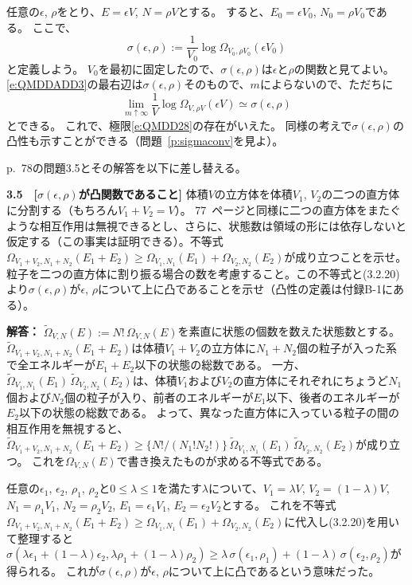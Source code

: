 \documentclass[12pt,a4paper]{jsarticle}
\begin{document}
任意の$\epsilon$, $\rho$をとり、$E=\epsilon V$, $N=\rho V$とする。
すると、$E_0=\epsilon V_0$, $N_0=\rho V_0$である。
ここで、
\begin{equation}
\sigma(\epsilon,\rho):=\frac{1}{V_0}\log\Omega_{V_0,\rho V_0}(\epsilon V_0)
\tag{3.2.34}
\label{e:QMDDADD4}
\end{equation}
と定義しよう。
$V_0$を最初に固定したので、$\sigma(\epsilon,\rho)$は$\epsilon$と$\rho$の関数と見てよい。
\eqref{e:QMDDADD3}の最右辺は$\sigma(\epsilon,\rho)$そのもので、$m$によらないので、ただちに
\begin{equation}
\lim_{m\uparrow\infty}\frac{1}{V}\log\Omega_{V,\rho V}(\epsilon V)
\simeq\sigma(\epsilon,\rho)
\tag{3.2.35}
\label{e:QMDDADD4BB}
\end{equation}
とできる。
これで、極限\eqref{e:QMDD28}の存在がいえた。
同様の考えで$\sigma(\epsilon,\rho)$の凸性も示すことができる（問題~\ref{p:sigmaconv}を見よ）。


\bigskip\bigskip

\noindent
p.~78の問題3.5とその解答を以下に差し替える。



\bigskip
\noindent
{\bf 3.5　[$\sigma(\epsilon,\rho)$が凸関数であること]} 
体積$V$の立方体を体積$V_1$, $V_2$の二つの直方体に分割する（もちろん$V_1+V_2=V$）。
77~ページと同様に二つの直方体をまたぐような相互作用は無視できるとし、さらに、状態数は領域の形には依存しないと仮定する（この事実は証明できる）。不等式$\Omega_{V_1+V_2,N_1+N_2}(E_1+E_2)\ge\Omega_{V_1,N_1}(E_1)+\Omega_{V_2,N_2}(E_2)$が成り立つことを示せ。粒子を二つの直方体に割り振る場合の数を考慮すること。この不等式と(3.2.20)より$\sigma(\epsilon,\rho)$が$\epsilon$, $\rho$について上に凸であることを示せ（凸性の定義は付録B-1にある）。

\medskip\noindent
{\bf 解答：}
$\widetilde{\Omega}_{V,N}(E):=N!\,{\Omega}_{V,N}(E)$を素直に状態の個数を数えた状態数とする。
$\widetilde{\Omega}_{V_1+V_2,N_1+N_2}(E_1+E_2)$は体積$V_1+V_2$の立方体に$N_1+N_2$個の粒子が入った系で全エネルギーが$E_1+E_2$以下の状態の総数である。
一方、$\widetilde{\Omega}_{V_1,N_1}(E_1)\,\widetilde{\Omega}_{V_2,N_2}(E_2)$は、体積$V_1$および$V_2$の直方体にそれぞれにちょうど$N_1$個および$N_2$個の粒子が入り、前者のエネルギーが$E_1$以下、後者のエネルギーが$E_2$以下の状態の総数である。
よって、異なった直方体に入っている粒子の間の相互作用を無視すると、$\widetilde{\Omega}_{V_1+V_2,N_1+N_2}(E_1+E_2)\ge\{N!/(N_1!N_2!)\}\,\widetilde{\Omega}_{V_1,N_1}(E_1)\,\widetilde{\Omega}_{V_2,N_2}(E_2)$が成り立つ。
これを${\Omega}_{V,N}(E)$で書き換えたものが求める不等式である。

任意の$\epsilon_1$, $\epsilon_2$, $\rho_1$, $\rho_2$と$0\le\lambda\le1$を満たす$\lambda$について、$V_1=\lambda V$, $V_2=(1-\lambda)V$, $N_1=\rho_1V_1$, $N_2=\rho_2V_2$, $E_1=\epsilon_1V_1$, $E_2=\epsilon_2V_2$とする。
これを不等式\newline$\Omega_{V_1+V_2,N_1+N_2}(E_1+E_2)\ge\Omega_{V_1,N_1}(E_1)+\Omega_{V_2,N_2}(E_2)$に代入し(3.2.20)を用いて整理すると$\sigma(\lambda\epsilon_1+(1-\lambda)\epsilon_2, \lambda\rho_1+(1-\lambda)\rho_2)\ge\lambda\,\sigma(\epsilon_1,\rho_1)+(1-\lambda)\,\sigma(\epsilon_2,\rho_2)$が得られる。
これが$\sigma(\epsilon,\rho)$が$\epsilon$, $\rho$について上に凸であるという意味だった。
\end{document}
